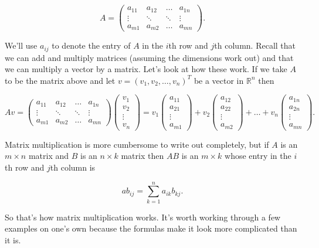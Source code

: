 \documentclass[12pt]{article}
\begin{document}
$$A = 
\begin{pmatrix} 
a_{11} & a_{12} & \ldots & a_{1n} \\
\vdots  & \ddots & \ddots & \vdots \\
a_{m1} & a_{m2} & \ldots & a_{mn}
\end{pmatrix}.$$

We'll use $a_{ij}$ to denote the entry of $A$ in the $i$th row and $j$th column. Recall that we can add and multiply matrices (assuming the dimensions work out) and that we can multiply a vector by a matrix. Let's look at how these work. If we take $A$ to be the matrix above and let $v = (v_1, v_2, \ldots, v_n)^T$ be a vector in $\mathbb{R}^n$ then
 
\[ Av = \begin{pmatrix} 
a_{11} & a_{12} & \ldots & a_{1n} \\
\vdots  & \ddots & \ddots & \vdots \\
a_{m1} & a_{m2} & \ldots & a_{mn}
\end{pmatrix}
%
\begin{pmatrix}
v_1 \\
v_2 \\
\vdots \\
v_n
\end{pmatrix} = 
%
v_1  \begin{pmatrix}
a_{11} \\
a_{21} \\
\vdots \\
a_{m1}
\end{pmatrix} +
%
v_2  \begin{pmatrix}
a_{12} \\
a_{22} \\
\vdots \\
a_{m2}
\end{pmatrix} +
\ldots +
%
v_n  \begin{pmatrix}
a_{1n} \\
a_{2n} \\
\vdots \\
a_{mn}
\end{pmatrix} .\]

Matrix multiplication is more cumbersome to write out completely, but if $A$ is an $m \times n$ matrix and $B$ is an $n \times k$ matrix then $AB$ is an $m \times k$ whose entry in the $i$th row and $j$th column is

$$ab_{ij} = \sum_{k = 1}^n a_{ik}b_{kj}.$$


So that's how matrix multiplication works. It's worth working through a few examples on one's own because the formulas make it look more complicated than it is.
\end{document}
